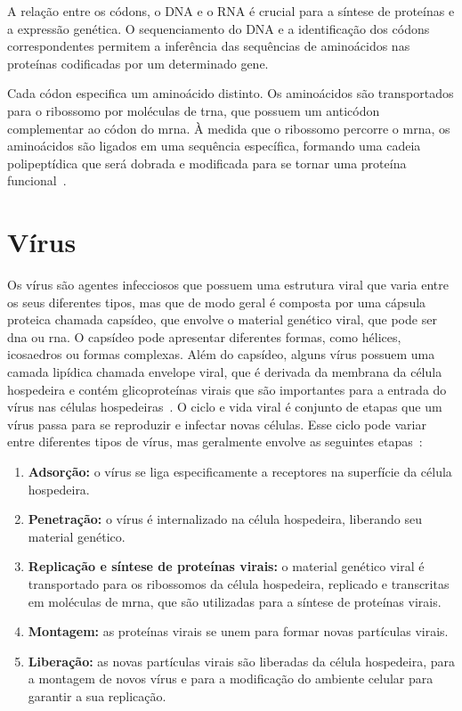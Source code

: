 A relação entre os códons, o DNA e o RNA é crucial para a síntese de proteínas e a expressão genética. O sequenciamento do DNA e a identificação dos códons correspondentes permitem a inferência das sequências de aminoácidos nas proteínas codificadas por um determinado gene.

Cada códon especifica um aminoácido distinto. Os aminoácidos são transportados para o ribossomo por moléculas de \gls{trna}, que possuem um anticódon complementar ao códon do \gls{mrna}. À medida que o ribossomo percorre o \gls{mrna}, os aminoácidos são ligados em uma sequência específica, formando uma cadeia polipeptídica que será dobrada e modificada para se tornar uma proteína funcional~\cite{alberts_biologia_2017}.

\section{Vírus}

Os vírus são agentes infecciosos que possuem uma estrutura viral que varia entre os seus diferentes tipos, mas que de modo geral é composta por uma cápsula proteica chamada capsídeo, que envolve o material genético viral, que pode ser \gls{dna} ou \gls{rna}. O capsídeo pode apresentar diferentes formas, como hélices, icosaedros ou formas complexas. Além do capsídeo, alguns vírus possuem uma camada lipídica chamada envelope viral, que é derivada da membrana da célula hospedeira e contém glicoproteínas virais que são importantes para a entrada do vírus nas células hospedeiras~\cite{david_virology_2022}.
O ciclo e vida viral é conjunto de etapas que um vírus passa para se reproduzir e infectar novas células. Esse ciclo pode variar entre diferentes tipos de vírus, mas geralmente envolve as seguintes etapas~\cite{alberts_molecular_2002}:

\begin{enumerate}
  \item \textbf{Adsorção:} o vírus se liga especificamente a receptores na superfície da célula hospedeira.
  \item \textbf{Penetração:} o vírus é internalizado na célula hospedeira, liberando seu material genético.
  \item \textbf{Replicação e síntese de proteínas virais:} o material genético viral é transportado para os ribossomos da célula hospedeira, replicado e transcritas em moléculas de \gls{mrna}, que são utilizadas para a síntese de proteínas virais.
  \item \textbf{Montagem:} as proteínas virais se unem para formar novas partículas virais.
  \item \textbf{Liberação:} as novas partículas virais são liberadas da célula hospedeira, para a montagem de novos vírus e para a modificação do ambiente celular para garantir a sua replicação.
\end{enumerate}

